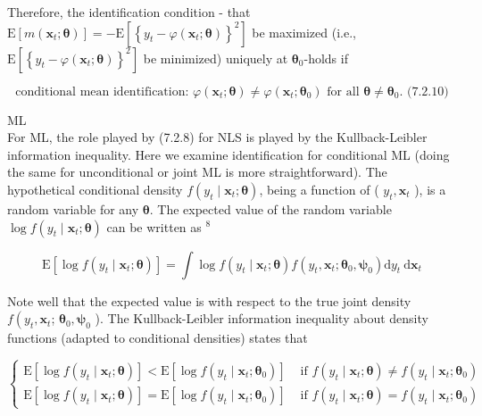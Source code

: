 \documentclass[10pt]{article}
\begin{document}
Therefore, the identification condition - that $\mathrm{E}\left[m\left(\mathbf{x}_{t} ; \boldsymbol{\theta}\right)\right]=-\mathrm{E}\left[\left\{y_{t}-\varphi\left(\mathbf{x}_{t} ; \boldsymbol{\theta}\right)\right\}^{2}\right]$ be maximized (i.e., $\mathrm{E}\left[\left\{y_{t}-\varphi\left(\mathbf{x}_{t} ; \boldsymbol{\theta}\right)\right\}^{2}\right]$ be minimized) uniquely at $\boldsymbol{\theta}_{0}$-holds if

$$
\text { conditional mean identification: } \varphi\left(\mathbf{x}_{t} ; \boldsymbol{\theta}\right) \neq \varphi\left(\mathbf{x}_{t} ; \boldsymbol{\theta}_{0}\right) \text { for all } \boldsymbol{\theta} \neq \boldsymbol{\theta}_{0} \text {. (7.2.10) }
$$

ML\\
For ML, the role played by (7.2.8) for NLS is played by the Kullback-Leibler information inequality. Here we examine identification for conditional ML (doing the same for unconditional or joint ML is more straightforward). The hypothetical conditional density $f\left(y_{t} \mid \mathbf{x}_{t} ; \boldsymbol{\theta}\right)$, being a function of ( $y_{t}, \mathbf{x}_{t}$ ), is a random variable for any $\boldsymbol{\theta}$. The expected value of the random variable $\log f\left(y_{t} \mid \mathbf{x}_{t} ; \boldsymbol{\theta}\right)$ can be written as ${ }^{8}$


\begin{equation*}
\mathrm{E}\left[\log f\left(y_{t} \mid \mathbf{x}_{t} ; \boldsymbol{\theta}\right)\right]=\int \log f\left(y_{t} \mid \mathbf{x}_{t} ; \boldsymbol{\theta}\right) f\left(y_{t}, \mathbf{x}_{t} ; \boldsymbol{\theta}_{0}, \boldsymbol{\psi}_{0}\right) \mathrm{d} y_{t} \mathrm{~d} \mathbf{x}_{t} \tag{7.2.11}
\end{equation*}


Note well that the expected value is with respect to the true joint density $f\left(y_{t}, \mathbf{x}_{t}\right.$; $\boldsymbol{\theta}_{0}, \boldsymbol{\psi}_{0}$ ). The Kullback-Leibler information inequality about density functions (adapted to conditional densities) states that

\[
\begin{cases}\mathrm{E}\left[\log f\left(y_{t} \mid \mathbf{x}_{t} ; \boldsymbol{\theta}\right)\right]<\mathrm{E}\left[\log f\left(y_{t} \mid \mathbf{x}_{t} ; \boldsymbol{\theta}_{0}\right)\right] & \text { if } f\left(y_{t} \mid \mathbf{x}_{t} ; \boldsymbol{\theta}\right) \neq f\left(y_{t} \mid \mathbf{x}_{t} ; \boldsymbol{\theta}_{0}\right)  \tag{7.2.12}\\ \mathrm{E}\left[\log f\left(y_{t} \mid \mathbf{x}_{t} ; \boldsymbol{\theta}\right)\right]=\mathrm{E}\left[\log f\left(y_{t} \mid \mathbf{x}_{t} ; \boldsymbol{\theta}_{0}\right)\right] & \text { if } f\left(y_{t} \mid \mathbf{x}_{t} ; \boldsymbol{\theta}\right)=f\left(y_{t} \mid \mathbf{x}_{t} ; \boldsymbol{\theta}_{0}\right)\end{cases}
\]
\end{document}
